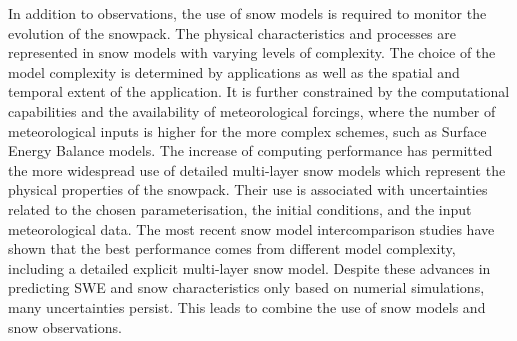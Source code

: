 \documentclass[utf8]{frontiersSCNS} %
\begin{document}
In addition to observations, the use of snow models is required to monitor the evolution of the snowpack. The physical characteristics and processes are represented in snow models with varying levels of complexity. The choice of the model complexity is determined by applications as well as the spatial and temporal extent of the application. It is further constrained by the computational capabilities and the availability of meteorological forcings, where the number of meteorological inputs is higher for the more complex schemes, such as Surface Energy Balance models. The increase of computing performance has permitted the more widespread use of detailed multi-layer snow models which represent the physical properties of the snowpack. Their use is associated with uncertainties related to the chosen parameterisation, the initial conditions, and the input meteorological data. The most recent snow model intercomparison studies have shown that %
the best performance comes from different model complexity, including a detailed explicit multi-layer snow model. Despite these advances in predicting SWE and snow characteristics only based on numerial simulations, many uncertainties persist. This leads to combine the use of snow models and snow observations.



\end{document}
